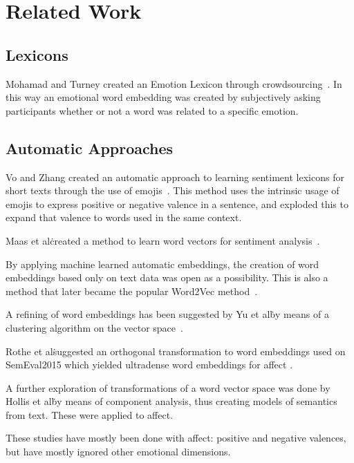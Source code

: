 \chapter{Related Work}\label{chap:Related Work}

\section{Lexicons}\label{sec:Lexicons}

Mohamad and Turney created an Emotion Lexicon through crowdsourcing~\cite{mohammad_crowdsourcing_2013}. In this way an emotional word embedding was created by subjectively asking participants whether or not a word was related to a specific emotion.

\section{Automatic Approaches}\label{sec:Automatic Approaches}
Vo and Zhang created an automatic approach to learning sentiment lexicons for short texts through the use of emojis~\cite{vo_dont_2016}. This method uses the intrinsic usage of emojis to express positive or negative valence in a sentence, and exploded this to expand that valence to words used in the same context.

Maas et al\. created a method to learn word vectors for sentiment analysis~\cite{maas_learning_2011}.

By applying machine learned automatic embeddings, the creation of word embeddings based only on text data was open as a possibility. This is also a method that later became the popular Word2Vec method~\cite{mikolov_distributed_2013}.

A refining of word embeddings has been suggested by Yu et al\. by means of a clustering algorithm on the vector space~\cite{yu_refining_2017}.

Rothe et al\. suggested an orthogonal transformation to word embeddings used on SemEval2015 which yielded ultradense word embeddings for affect \cite{rothe_ultradense_2016}.

A further exploration of transformations of a word vector space was done by Hollis et al\. by means of component analysis, thus creating models of semantics from text. These were applied to affect\cite{hollis_principals_2016}.

These studies have mostly been done with affect: positive and negative valences, but have mostly ignored other emotional dimensions.

